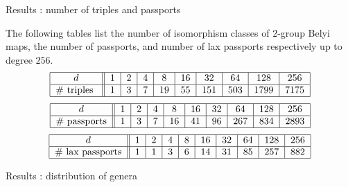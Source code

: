 \documentclass[xcolor=dvipsnames,handout]{beamer}
\theoremstyle{plain}
\begin{document}
{    \begin{frame}{Results : number of triples and passports}
      \begin{theorem}[M.]
        \vspace{1pt}
        The following tables list
        the number of isomorphism classes of
        $2$-group Belyi maps,
        the number of passports, and number of
        lax passports respectively
        up to degree $256$.
        \begin{equation*}
          \begin{tabular}{|c||c|c|c|c|c|c|c|c|c|}
            \hline
            $d$ & $1$ & $2$ & $4$ & $8$ & $16$ & $32$ & $64$ & $128$ & $256$\\
            \hline
            \#\text{ triples } & $1$ & $3$ & $7$ & $19$ & $55$ & $151$ & $503$ & $1799$ & $7175$\\
            \hline
          \end{tabular}
        \end{equation*}
        \begin{equation*}
          \begin{tabular}{|c||c|c|c|c|c|c|c|c|c|}
            \hline
            $d$ & $1$ & $2$ & $4$ & $8$ & $16$ & $32$ & $64$ & $128$ & $256$\\
            \hline
            \# passports & $1$ & $3$ & $7$ & $16$ & $41$ & $96$ & $267$ & $834$ & $2893$\\
            \hline
          \end{tabular}
        \end{equation*}
        \begin{equation*}
          \begin{tabular}{|c||c|c|c|c|c|c|c|c|c|}
            \hline
            $d$ & $1$ & $2$ & $4$ & $8$ & $16$ & $32$ & $64$ & $128$ & $256$\\
            \hline
            \# lax passports & $1$ & $1$ & $3$ & $6$ & $14$ & $31$ & $85$ & $257$ & $882$\\
            \hline
          \end{tabular}
        \end{equation*}
      \end{theorem}
    \end{frame}
    \begin{frame}[fragile]{Results : distribution of genera}
      \begin{figure}[ht]
        \centering
        \begin{tikzpicture}[scale=1]

\end{tikzpicture}
\end{figure}
\end{frame}}
\end{document}
